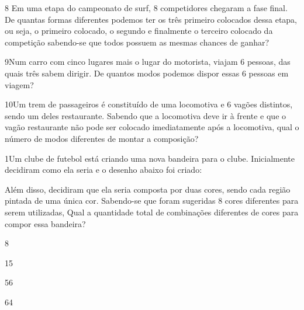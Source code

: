 

\num{8} Em uma etapa do campeonato de surf, 8 competidores chegaram a fase
final. De quantas formas diferentes podemos ter os três primeiro
colocados dessa etapa, ou seja, o primeiro colocado, o segundo e
finalmente o terceiro colocado da competição sabendo-se que todos
possuem as mesmas chances de ganhar?



\num{9}Num carro com cinco lugares mais o lugar do motorista, viajam 6
pessoas, das quais três sabem dirigir. De quantos modos podemos dispor
essas 6 pessoas em viagem?



\num{10}Um trem de passageiros é constituído de uma locomotiva e 6 vagões
distintos, sendo um deles restaurante. Sabendo que a locomotiva deve ir
à frente e que o vagão restaurante não pode ser colocado imediatamente
após a locomotiva, qual o número de modos diferentes de montar a
composição?




\num{1}Um clube de futebol está criando uma nova bandeira para o clube.
Inicialmente decidiram como ela seria e o desenho abaixo foi criado:


Além disso, decidiram que ela seria composta por duas cores, sendo cada
região pintada de uma única cor. Sabendo-se que foram sugeridas 8 cores
diferentes para serem utilizadas, Qual a quantidade total de combinações
diferentes de cores para compor essa bandeira?

\begin{escolha}
\item
  8
\item
  15
\item
  56
\item
  64
\end{escolha}

